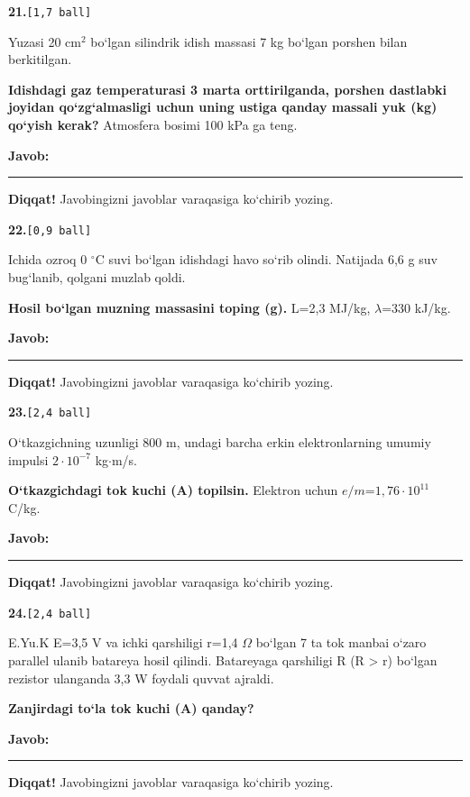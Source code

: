 \documentclass[11pt,a4paper]{article}
\newcommand{\ball}[1]{\hfill\texttt{[#1 ball]}}
\newcommand{\qhead}[2]{\Needspace{10\baselineskip}\noindent\textbf{#1.}\ball{#2}\par\nopagebreak}
\newenvironment{qbody}{\begin{list}{}{\leftmargin=8mm\rightmargin=0pt\topsep=0pt\itemsep=0pt\parsep=3pt}\item\relax}{\end{list}}
\begin{document}
\qhead{21}{1,7}
\begin{qbody}
Yuzasi 20 cm$^{2}$ bo‘lgan silindrik idish massasi 7 kg bo‘lgan porshen bilan berkitilgan.\par
\textbf{Idishdagi gaz temperaturasi 3 marta orttirilganda, porshen dastlabki joyidan qo‘zg‘almasligi uchun uning ustiga qanday massali yuk (kg) qo‘yish kerak?} Atmosfera bosimi 100 kPa ga teng.\par
\medskip\textbf{Javob:}\ \rule{5cm}{0.4pt}\par
\textbf{Diqqat!} Javobingizni javoblar varaqasiga ko‘chirib yozing.\par
\end{qbody}\vspace{18pt}
\qhead{22}{0,9}
\begin{qbody}
Ichida ozroq 0 $^\circ$C suvi bo‘lgan idishdagi havo so‘rib olindi. Natijada 6,6 g suv bug‘lanib, qolgani muzlab qoldi.\par
\textbf{Hosil bo‘lgan muzning massasini toping (g).} L=2,3 MJ/kg, $\lambda$=330 kJ/kg.\par
\medskip\textbf{Javob:}\ \rule{5cm}{0.4pt}\par
\textbf{Diqqat!} Javobingizni javoblar varaqasiga ko‘chirib yozing.\par
\end{qbody}\vspace{18pt}
\qhead{23}{2,4}
\begin{qbody}
O‘tkazgichning uzunligi 800 m, undagi barcha erkin elektronlarning umumiy impulsi $2\cdot10^{-7}$ kg$\cdot$m/s.\par
\textbf{O‘tkazgichdagi tok kuchi (A) topilsin.} Elektron uchun $e/m$=$1{,}76\cdot10^{11}$ C/kg.\par
\medskip\textbf{Javob:}\ \rule{5cm}{0.4pt}\par
\textbf{Diqqat!} Javobingizni javoblar varaqasiga ko‘chirib yozing.\par
\end{qbody}\vspace{18pt}
\qhead{24}{2,4}
\begin{qbody}
E.Yu.K E=3,5 V va ichki qarshiligi r=1,4 $\Omega$ bo‘lgan 7 ta tok manbai o‘zaro parallel ulanib batareya hosil qilindi. Batareyaga qarshiligi R (R \textgreater{} r) bo‘lgan rezistor ulanganda 3,3 W foydali quvvat ajraldi.\par
\textbf{Zanjirdagi to‘la tok kuchi (A) qanday?}\par
\medskip\textbf{Javob:}\ \rule{5cm}{0.4pt}\par
\textbf{Diqqat!} Javobingizni javoblar varaqasiga ko‘chirib yozing.\par
\end{qbody}\vspace{18pt}
\end{document}
